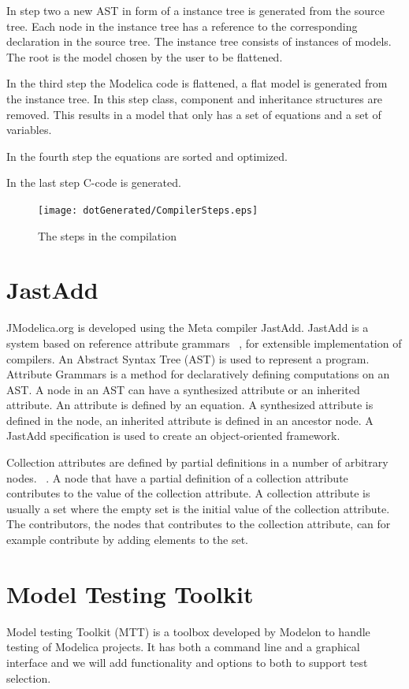 \documentclass{cslthse-msc}
\begin{document}
In step two a new AST in form of a instance tree is generated from the source tree. Each node in the instance tree has a reference to the corresponding declaration in the source tree. The instance tree consists of instances of models. The root is the model chosen by the user to be flattened.

In the third step the Modelica code is flattened, a flat model is generated from the instance tree. In this step class, component and inheritance structures are removed. This results in a model that only has a set of equations and a set of variables.

In the fourth step the equations are sorted and optimized.

In the last step C-code is generated.

\begin{figure}[!htbp]
    \centering
    {\texttt{[image: dotGenerated/CompilerSteps.eps]}}
    \caption{The steps in the compilation}
    \label{fig:compilerSteps}
\end{figure}

\section{JastAdd}
JModelica.org is developed using the Meta compiler JastAdd. JastAdd is a system based on reference attribute grammars ~\cite{aakesson2010implementation}, for extensible implementation of compilers. An Abstract Syntax Tree (AST) is used to represent a program. Attribute Grammars is a method for declaratively defining computations on an AST. A node in an AST can have a synthesized attribute or an inherited attribute. An attribute is defined by an equation. A synthesized attribute is defined in the node, an inherited attribute is defined in an ancestor node. A JastAdd specification is used to create an object-oriented framework.

Collection attributes are defined by partial definitions in a number of arbitrary nodes. ~\cite{magnusson2007extending}. A node that have a partial definition of a collection attribute contributes to the value of the collection attribute. A collection attribute is usually a set where the empty set is the initial value of the collection attribute. The contributors, the nodes that contributes to the collection attribute, can for example contribute by adding elements to the set.

\section{Model Testing Toolkit}
Model testing Toolkit (MTT) is a toolbox developed by Modelon to handle testing of Modelica projects. It has both a command line and a graphical interface and we will add functionality and options to both to support test selection.
\end{document}
